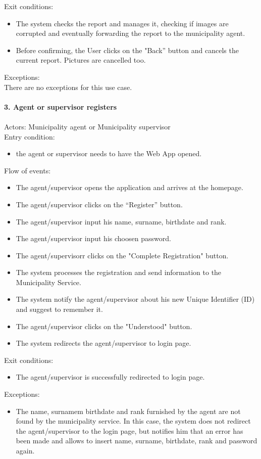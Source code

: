 \documentclass[a4paper]{report}
\begin{document}
Exit conditions:
\begin{itemize}
\item The system checks the report and manages it, checking if images are corrupted and eventually forwarding the report to the municipality agent.
\item	Before confirming, the User clicks on the "Back” button and cancels the current report. Pictures are cancelled too. 
\end{itemize}
Exceptions: \\
There are no exceptions for this use case. 
\\
\\
\textbf{3. Agent or supervisor registers}
\\
\\
Actors: Municipality agent or Municipality supervisor \\
Entry condition:
\begin{itemize}
\item the agent or supervisor needs to have the Web App opened.
\end{itemize}
Flow of events:
\begin{itemize}
\item The agent/supervisor opens the application and arrives at the homepage.
\item The agent/supervisor clicks on the “Register” button.
\item The agent/supervisor input his name, surname, birthdate and rank.
\item The agent/supervisor input his choosen password.
\item	The agent/supervisorr clicks on the "Complete Registration" button.
\item The system processes the registration and send information to the Municipality Service.
\item The system notify the agent/supervisor about his new Unique Identifier (ID) and suggest to remember it.
\item The agent/supervisor clicks on the "Understood" button.
\item	The system redirects the agent/supervisor to login page.
\end{itemize}
Exit conditions:
\begin{itemize}
\item The agent/supervisor is successfully redirected to login page.
 \end{itemize}
Exceptions: 
 \begin{itemize}
 \item The name, surnamem birthdate and rank furnished by the agent are not found by the municipality service. In this case, the system does not redirect the agent/supervisor to the login page, but notifies him that an error has been made and allows to insert name, surname, birthdate, rank and password again.
\end{itemize}
\end{document}
